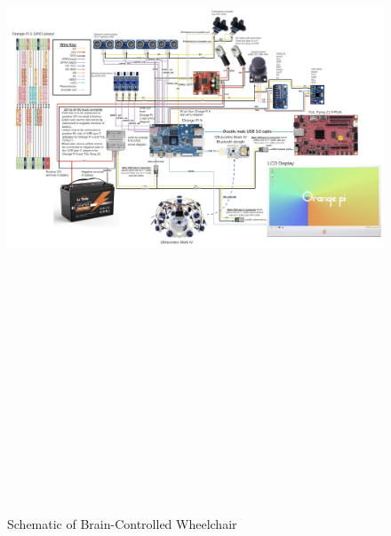 \documentclass[conference]{IEEEtran}
\begin{document}
    \onecolumn
    \begin{figure}
        \centering
        \centerline{\includegraphics[angle=90,height=9in, keepaspectratio]{figs/E/schematic.png}}
        \caption{Schematic of Brain-Controlled Wheelchair}
        \label{fig:schematic}
    \end{figure}
    \twocolumn
\end{document}
